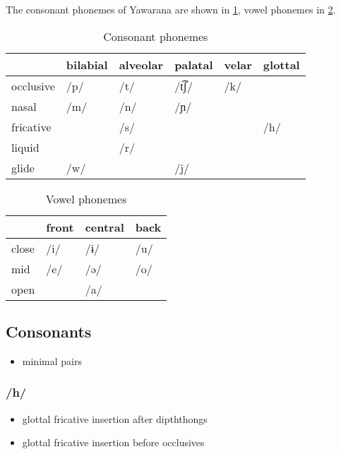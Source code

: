 \documentclass{memoir}
\begin{document}
The consonant phonemes of Yawarana are shown in \cref{tab:consonants},
vowel phonemes in \cref{tab:vowels}.

\begin{table}
\caption{Consonant phonemes}
\label{tab:consonants}
\centering
\begin{tabular}{llllll}
\toprule
          & bilabial & alveolar & palatal & velar & glottal \\
\midrule
occlusive &     /p/  &     /t/  &  /t͡ʃ/  &   /k/ &         \\
    nasal &     /m/  &     /n/  &    /ɲ/  &       &         \\
fricative &          &     /s/  &         &       &    /h/  \\
   liquid &          &     /r/  &         &       &         \\
    glide &     /w/  &          &     /j/ &       &         \\
\bottomrule
\end{tabular}

\end{table}

\begin{table}
\caption{Vowel phonemes}
\label{tab:vowels}
\centering
\begin{tabular}{llll}
\toprule
      & front & central & back \\
\midrule
close &  /i/  &    /ɨ/  & /u/  \\
  mid &  /e/  &    /ə/  & /o/  \\
 open &       &    /a/  &      \\
\bottomrule
\end{tabular}

\end{table}

\subsection{\texorpdfstring{Consonants
\label{sec:consonants}}{Consonants }}

\begin{itemize}
\tightlist
\item
  minimal pairs
\end{itemize}

\subsubsection{/h/}

\begin{itemize}
\tightlist
\item
  glottal fricative insertion after dipththongs
\item
  glottal fricative insertion before occlusives
\end{itemize}
\end{document}
